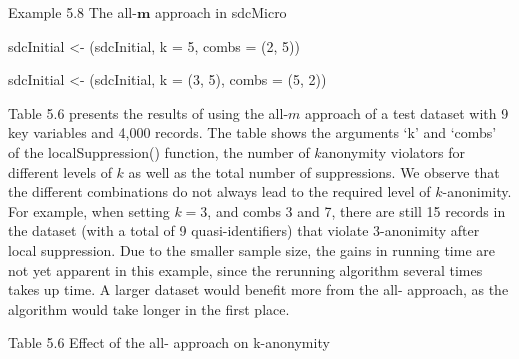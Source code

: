 \documentclass[letterpaper,10pt,english]{sphinxmanual}
\begin{document}
Example 5.8 The all-\(\mathbf{m}\) approach in sdcMicro

\begin{DUlineblock}{0em}
\item[] 
\item[] sdcInitial \textless{}- (sdcInitial, k = 5, combs =
(2, 5))
\end{DUlineblock}

\begin{DUlineblock}{0em}
\item[] 
\item[] sdcInitial \textless{}- (sdcInitial, k = (3, 5),
combs = (5, 2))
\end{DUlineblock}

Table 5.6 presents the results of using the all-\(m\) approach of
a test dataset with 9 key variables and 4,000 records. The table shows
the arguments ‘k’ and ‘combs’ of the localSuppression() function, the
number of \(k\)\sphinxstyleemphasis{-}anonymity violators for different levels of
\(k\) as well as the total number of suppressions. We observe that
the different combinations do not always lead to the required level of
\(k\)-anonimity. For example, when setting \(k = 3\), and combs
3 and 7, there are still 15 records in the dataset (with a total of 9
quasi-identifiers) that violate 3-anonimity after local suppression. Due
to the smaller sample size, the gains in running time are not yet
apparent in this example, since the rerunning algorithm several times
takes up time. A larger dataset would benefit more from the all-
approach, as the algorithm would take longer in the first place.

Table 5.6 Effect of the all- approach on k-anonymity
\end{document}
